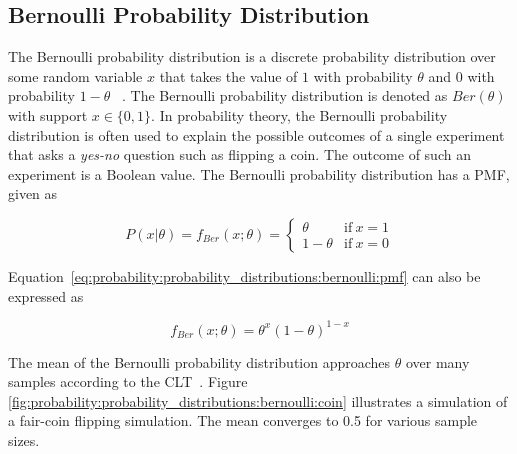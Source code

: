 \subsection{Bernoulli Probability Distribution}\label{sec:probability:probability_distributions:bernoulli}

The Bernoulli probability distribution is a discrete probability distribution over some random variable $x$ that takes the value of $1$ with probability $\theta$ and $0$ with probability $1-\theta$ ~\cite{ref:wackerly:2014}. The Bernoulli probability distribution is denoted as $Ber(\theta)$ with support $x \in \{0, 1\}$. In probability theory, the Bernoulli probability distribution is often used to explain the possible outcomes of a single experiment that asks a \textit{yes-no} question such as flipping a coin. The outcome of such an experiment is a Boolean value. The Bernoulli probability distribution has a \acs{PMF}, given as

\begin{equation}
      \label{eq:probability:probability_distributions:bernoulli:pmf}
      P(x \vert \theta) = f_{Ber}(x; \theta) =
      \begin{cases}
            \theta     & \text{if}\ x=1 \\
            1 - \theta & \text{if}\ x=0
      \end{cases}
\end{equation}

Equation~\eqref{eq:probability:probability_distributions:bernoulli:pmf} can also be expressed as

\begin{equation}
      \label{eq:probability:probability_distributions:bernoulli:alt}
      f_{Ber}(x; \theta) = \theta^{x}(1-\theta)^{1-x}
\end{equation}

The mean of the Bernoulli probability distribution approaches $\theta$ over many samples according to the \acs{CLT}~\cite{ref:grinstead:1997}. Figure \ref{fig:probability:probability_distributions:bernoulli:coin} illustrates a simulation of a fair-coin flipping simulation. The mean converges to 0.5 for various sample sizes.

